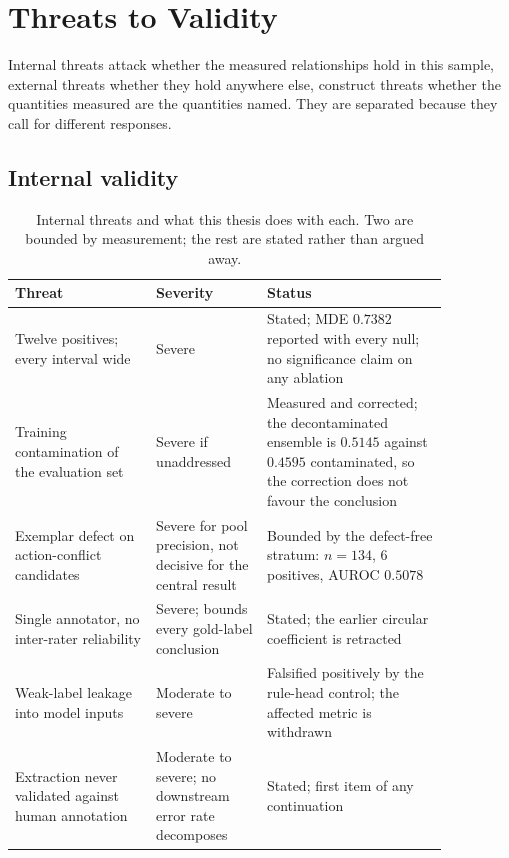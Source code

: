\section{Threats to Validity}
\label{sec:disc-threats}

Internal threats attack whether the measured relationships hold in this sample,
external threats whether they hold anywhere else, construct threats whether the
quantities measured are the quantities named. They are separated because they
call for different responses.

\subsection{Internal validity}

\begin{table}[H]
\centering
\caption{Internal threats and what this thesis does with each. Two are bounded by
measurement; the rest are stated rather than argued away.}
\label{tab:disc-internal}
\small
\begin{tabular}{p{0.28\linewidth}p{0.22\linewidth}p{0.36\linewidth}}
\toprule
\textbf{Threat} & \textbf{Severity} & \textbf{Status} \\
\midrule
Twelve positives; every interval wide & Severe & Stated; MDE $0.7382$ reported with every null; no significance claim on any ablation \\
\addlinespace
Training contamination of the evaluation set & Severe if unaddressed & Measured and corrected; the decontaminated ensemble is $0.5145$ against $0.4595$ contaminated, so the correction does not favour the conclusion \\
\addlinespace
Exemplar defect on action-conflict candidates & Severe for pool precision, not decisive for the central result & Bounded by the defect-free stratum: $n = 134$, $6$ positives, AUROC $0.5078$ \\
\addlinespace
Single annotator, no inter-rater reliability & Severe; bounds every gold-label conclusion & Stated; the earlier circular coefficient is retracted \\
\addlinespace
Weak-label leakage into model inputs & Moderate to severe & Falsified positively by the rule-head control; the affected metric is withdrawn \\
\addlinespace
Extraction never validated against human annotation & Moderate to severe; no downstream error rate decomposes & Stated; first item of any continuation \\
\bottomrule
\end{tabular}
\end{table}

